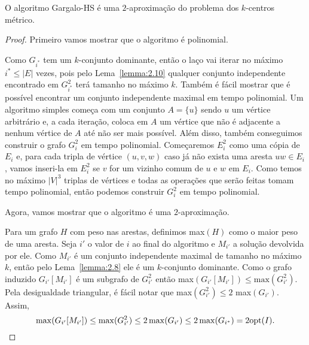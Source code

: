 \begin{theorem}
    O algoritmo {\sc Gargalo-HS} é uma $2$-aproximação do problema dos $k$-centros métrico.
\end{theorem}
\begin{proof}
    Primeiro vamos mostrar que o algoritmo é polinomial.
    
    Como $G_{i^*}$ tem um $k$-conjunto dominante, então o laço vai iterar no máximo $i^* \leq |E|$ vezes, pois pelo Lema~\ref{lemma:2.10} qualquer conjunto independente encontrado em $G_{i^*}^2$ terá tamanho no máximo $k$.
    Também é fácil mostrar que é possível encontrar um conjunto independente maximal em tempo polinomial. Um algoritmo simples começa com um conjunto $A = \{u\}$ sendo $u$ um vértice arbitrário e, a cada iteração, coloca em $A$ um vértice que não é adjacente a nenhum vértice de $A$ até não ser mais possível.
    Além disso, também conseguimos construir o grafo $G_i^2$ em tempo polinomial. Começaremos $E_i^2$ como uma cópia de $E_i$ e, para cada tripla de vértice $(u,v,w)$ caso já não exista uma aresta $uw \in E_i$, vamos inseri-la em $E_i^2$ se $v$ for um vizinho comum de $u$ e $w$ em $E_i$. Como temos no máximo $|V|^3$ triplas de vértices e todas as operações que serão feitas tomam tempo polinomial, então podemos construir $G_i^2$ em tempo polinomial.

    Agora, vamos mostrar que o algoritmo é uma $2$-aproximação.

    Para um grafo $H$ com peso nas arestas, definimos max$(H)$ como o maior peso de uma aresta. Seja $i'$ o valor de $i$ ao final do algoritmo e $M_{i'}$ a solução devolvida por ele. Como $M_{i'}$ é um conjunto independente maximal de tamanho no máximo $k$, então pelo Lema~\ref{lemma:2.8} ele é um $k$-conjunto dominante. Como o grafo induzido $G_{i'}[M_{i'}]$ é um subgrafo de $G_{i'}^2$ então max$(G_{i'}[M_{i'}]) \leq \text{max}(G_{i'}^2) $. Pela desigualdade triangular, é fácil notar que max$(G_{i'}^2) \leq 2$  max$(G_{i'})$. Assim, 
    \begin{equation}
        \max(G_{i'}[M_{i'}]) \leq  \max(G_{i'}^2) \leq 2 \max(G_{i'}) \leq 2 \max(G_{i^*})= 2 \mathrm{opt}(I). \nonumber
    \end{equation}
\end{proof}

